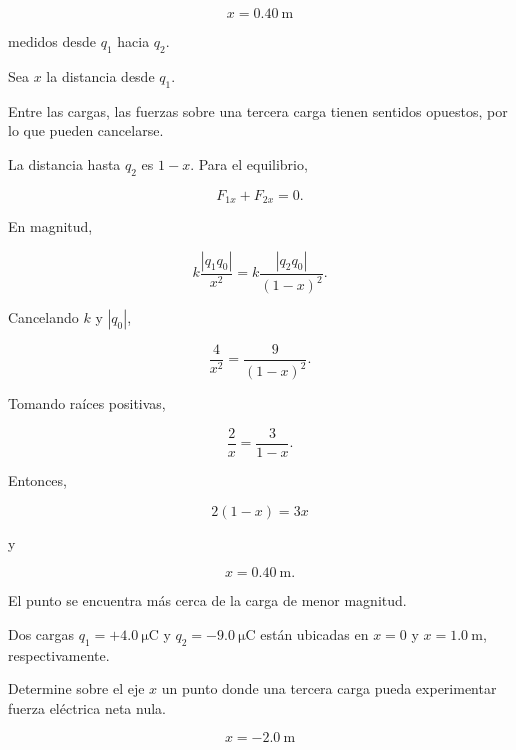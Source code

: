\begin{respuesta}
\[
\boxed{x=\SI{0.40}{\metre}}
\]

medidos desde \(q_1\) hacia \(q_2\).
\end{respuesta}

\begin{explicacion}
Sea \(x\) la distancia desde \(q_1\).

Entre las cargas, las fuerzas sobre una tercera carga tienen sentidos
opuestos, por lo que pueden cancelarse.

La distancia hasta \(q_2\) es \(1-x\). Para el equilibrio,

\[
F_{1x}+F_{2x}=0.
\]

En magnitud,

\[
k\frac{|q_1q_0|}{x^2}
=
k\frac{|q_2q_0|}{(1-x)^2}.
\]

Cancelando \(k\) y \(|q_0|\),

\[
\frac{4}{x^2}=\frac{9}{(1-x)^2}.
\]

Tomando raíces positivas,

\[
\frac{2}{x}=\frac{3}{1-x}.
\]

Entonces,

\[
2(1-x)=3x
\]

y

\[
\boxed{x=\SI{0.40}{\metre}}.
\]

El punto se encuentra más cerca de la carga de menor magnitud.
\end{explicacion}


\begin{ejercicio}
Dos cargas \(q_1=+\SI{4.0}{\micro\coulomb}\) y
\(q_2=-\SI{9.0}{\micro\coulomb}\) están ubicadas en \(x=0\) y
\(x=\SI{1.0}{\metre}\), respectivamente.

Determine sobre el eje \(x\) un punto donde una tercera carga pueda
experimentar fuerza eléctrica neta nula.
\end{ejercicio}

\begin{respuesta}
\[
\boxed{x=-\SI{2.0}{\metre}}
\]
\end{respuesta}

